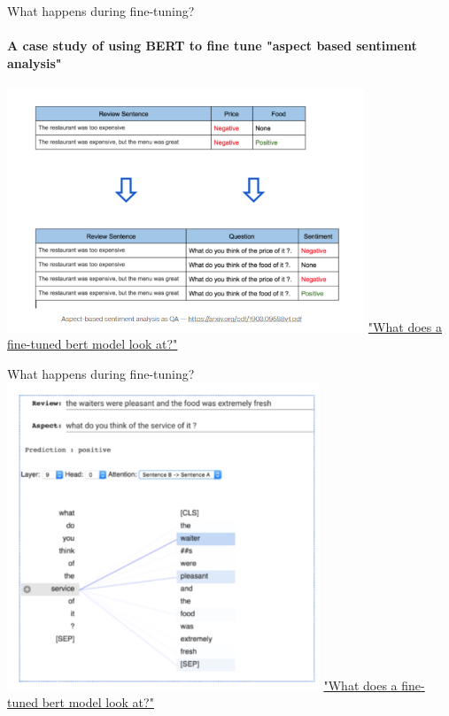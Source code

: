 \documentclass{beamer}
\begin{document}
\begin{frame}{What happens during fine-tuning?}
\framesubtitle{A case study of using BERT to fine tune "aspect based sentiment analysis"}
    \includegraphics[width=0.8\textwidth]{figures/aspect.png}
    \href{https://towardsdatascience.com/what-does-a-fine-tuned-bert-model-look-at-2eb39b6868dd}{"What does a fine-tuned bert model look at?"}
\end{frame}

\begin{frame}{What happens during fine-tuning?}
    \includegraphics[width=0.7\textwidth]{figures/aspect2.png}
    \href{https://towardsdatascience.com/what-does-a-fine-tuned-bert-model-look-at-2eb39b6868dd}{"What does a fine-tuned bert model look at?"}
\end{frame}
\end{document}
